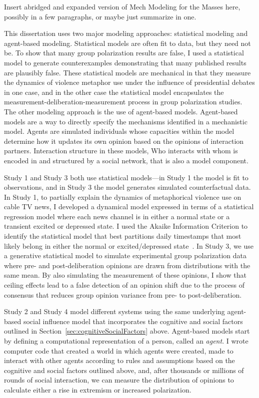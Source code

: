 \documentclass[12pt,letterpaper]{article}
\begin{document}
Insert abridged and expanded version of Mech Modeling for the Masses
here, possibly in a few paragraphs, or maybe just summarize in one.

This dissertation uses two major modeling 
approaches: statistical modeling and agent-based modeling. Statistical
models are often fit to data, but they need not be. To show that
many group polarization results are false, I used a statistical model
to generate counterexamples demonstrating that many published results are
plausibly false. These statistical models are mechanical in that they measure
the dynamics of violence metaphor use under the influence of presidential
debates in one case, and in the other case the statistical model encapsulates
the measurement-deliberation-measurement process in group polarization studies. 
The other modeling approach is the use of agent-based
models. Agent-based models are a way to directly specify the mechanisms
identified in a mechanistic model. Agents are simulated individuals whose
capacities within the model determine how it updates its own opinion based on
the opinions of interaction partners. Interaction structure in these models,
Who interacts with whom is encoded in and structured by a social network, that
is also a model component.

Study 1 and Study 3 both use statistical models---in Study 1 the model is fit
to observations, and in Study 3 the model generates simulated counterfactual
data. In Study 1, to partially explain the dynamics of metaphorical violence use on cable TV news,
I developed a dynamical model expressed in terms of a statistical regression
model where each news channel is in either a normal state or a 
transient excited or depressed state. I used the Akaike Information 
Criterion to identify the statistical model
that best partitions daily timestamps that most likely belong in either the
normal or excited/depressed state~\cite{Burnham2004,Burnham2011}. 
In Study 3, we use a generative 
statistical model to simulate experimental group polarization data where
pre- and post-deliberation opinions are drawn from distributions with the
same mean. By also simulating the measurement of these opinions, I show
that ceiling effects lead to a false detection of an opinion shift due to
the process of consensus that reduces group opinion variance from
pre- to post-deliberation.

Study 2 and Study 4 model different systems using the same underlying
agent-based social influence model that incorporates the cognitive and social 
factors outlined in Section~\ref{sec:cognitiveSocialFactors} above. Agent-based
models start by defining a computational representation of a person, called
an \emph{agent}. I wrote computer code that created a world in which agents
were created, made to interact with other agents according to rules and
assumptions based on the cognitive and social factors outlined above, and, 
after thousands or millions of rounds of social interaction, we can measure
the distribution of opinions to calculate either a rise in extremism or
increased polarization.
     
\end{document}
